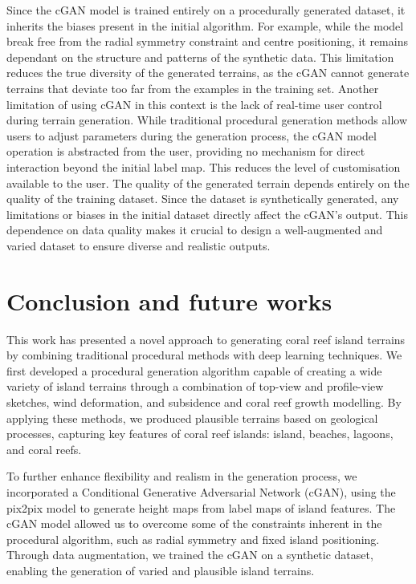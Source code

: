 \begin{Itemize}
     Since the cGAN model is trained entirely on a procedurally generated dataset, it inherits the biases present in the initial algorithm. For example, while the model break free from the radial symmetry constraint and centre positioning, it remains dependant on the structure and patterns of the synthetic data. This limitation reduces the true diversity of the generated terrains, as the cGAN cannot generate terrains that deviate too far from the examples in the training set.
     Another limitation of using cGAN in this context is the lack of real-time user control during terrain generation. While traditional procedural generation methods allow users to adjust parameters during the generation process, the cGAN model operation is abstracted from the user, providing no mechanism for direct interaction beyond the initial label map. This reduces the level of customisation available to the user.
     The quality of the generated terrain depends entirely on the quality of the training dataset. Since the dataset is synthetically generated, any limitations or biases in the initial dataset directly affect the cGAN's output. This dependence on data quality makes it crucial to design a well-augmented and varied dataset to ensure diverse and realistic outputs.
\end{Itemize}

\section{Conclusion and future works}
\label{sec:coral-island-conclusion}

This work has presented a novel approach to generating coral reef island terrains by combining traditional procedural methods with deep learning techniques. We first developed a procedural generation algorithm capable of creating a wide variety of island terrains through a combination of top-view and profile-view sketches, wind deformation, and subsidence and coral reef growth modelling. By applying these methods, we produced plausible terrains based on geological processes, capturing key features of coral reef islands: island, beaches, lagoons, and coral reefs.

To further enhance flexibility and realism in the generation process, we incorporated a Conditional Generative Adversarial Network (cGAN), using the pix2pix model to generate height maps from label maps of island features. The cGAN model allowed us to overcome some of the constraints inherent in the procedural algorithm, such as radial symmetry and fixed island positioning. Through data augmentation, we trained the cGAN on a synthetic dataset, enabling the generation of varied and plausible island terrains.

